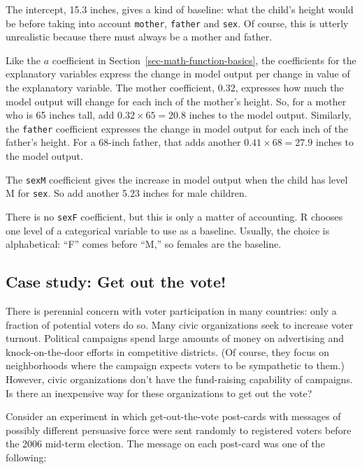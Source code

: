 \documentclass[
  letterpaper,
  DIV=11,
  numbers=noendperiod,
  oneside]{scrartcl}
\begin{document}
The intercept, 15.3 inches, gives a kind of baseline: what the child's
height would be before taking into account \texttt{mother},
\texttt{father} and \texttt{sex}. Of course, this is utterly unrealistic
because there must always be a mother and father.

Like the \(a\) coefficient in Section~\ref{sec-math-function-basics},
the coefficients for the explanatory variables express the change in
model output per change in value of the explanatory variable. The mother
coefficient, 0.32, expresses how much the model output will change for
each inch of the mother's height. So, for a mother who is 65 inches
tall, add \(0.32 \times 65 = 20.8\) inches to the model output.
Similarly, the \texttt{father} coefficient expresses the change in model
output for each inch of the father's height. For a 68-inch father, that
adds another \(0.41 \times 68 = 27.9\) inches to the model output.

The \texttt{sexM} coefficient gives the increase in model output when
the child has level M for \texttt{sex}. So add another 5.23 inches for
male children.

There is no \texttt{sexF} coefficient, but this is only a matter of
accounting. R chooses one level of a categorical variable to use as a
baseline. Usually, the choice is alphabetical: ``F'' comes before ``M,''
so females are the baseline.

\subsection{Case study: Get out the
vote!}\label{case-study-get-out-the-vote}

There is perennial concern with voter participation in many countries:
only a fraction of potential voters do so. Many civic organizations seek
to increase voter turnout. Political campaigns spend large amounts of
money on advertising and knock-on-the-door efforts in competitive
districts. (Of course, they focus on neighborhoods where the campaign
expects voters to be sympathetic to them.) However, civic organizations
don't have the fund-raising capability of campaigns. Is there an
inexpensive way for these organizations to get out the vote?

Consider an experiment in which get-out-the-vote post-cards with
messages of possibly different persuasive force were sent randomly to
registered voters before the 2006 mid-term election.
{} The
message on each post-card was one of the following:
\end{document}

